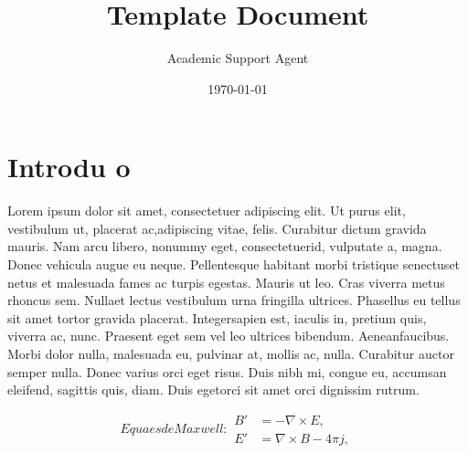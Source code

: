 \documentclass{article}
\title{Template Document}
\author{Academic Support Agent}
\date{\today}
\begin{document}
\maketitle

\pretext %


\section{Introdu o}

Lorem ipsum dolor sit amet, consectetuer adipiscing elit. Ut purus elit, vestibulum ut, placerat ac,adipiscing vitae, felis. Curabitur dictum gravida mauris. Nam arcu libero, nonummy eget, consectetuerid, vulputate a, magna. Donec vehicula augue eu neque. Pellentesque habitant morbi tristique senectuset netus et malesuada fames ac turpis egestas.  Mauris ut leo.  Cras viverra metus rhoncus sem.  Nullaet lectus vestibulum urna fringilla ultrices. Phasellus eu tellus sit amet tortor gravida placerat. Integersapien est, iaculis in, pretium quis, viverra ac, nunc. Praesent eget sem vel leo ultrices bibendum. Aeneanfaucibus. Morbi dolor nulla, malesuada eu, pulvinar at, mollis ac, nulla. Curabitur auctor semper nulla. Donec varius orci eget risus. Duis nibh mi, congue eu, accumsan eleifend, sagittis quis, diam. Duis egetorci sit amet orci dignissim rutrum.

\begin{subequations}
\label{eq:Maxwell}
Equa es de Maxwell:
\begin{align}
        B'&=-\nabla \times E,         \label{eq:MaxB} \\
        E'&=\nabla \times B - 4\pi j, \label{eq:MaxE}
\end{align}
\end{subequations}
\end{document}
